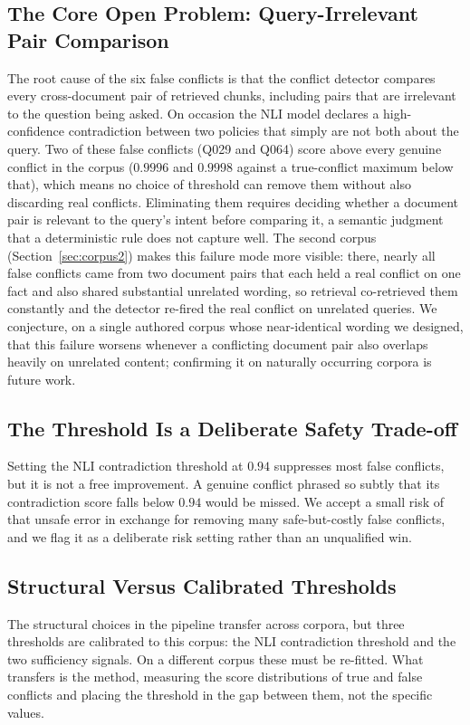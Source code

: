 \documentclass[conference]{IEEEtran}
\begin{document}
\subsection{The Core Open Problem: Query-Irrelevant Pair Comparison}
The root cause of the six false conflicts is that the conflict detector
compares every cross-document pair of retrieved chunks, including pairs that
are irrelevant to the question being asked. On occasion the NLI model
declares a high-confidence contradiction between two policies that simply
are not both about the query. Two of these false conflicts (Q029 and Q064)
score above every genuine conflict in the corpus ($0.9996$ and $0.9998$
against a true-conflict maximum below that), which means no choice of
threshold can remove them without also discarding real conflicts.
Eliminating them requires deciding whether a document pair is relevant to
the query's intent before comparing it, a semantic judgment that a
deterministic rule does not capture well. The second corpus
(Section~\ref{sec:corpus2}) makes this failure mode more visible: there,
nearly all false conflicts came from two document pairs that each held a real
conflict on one fact and also shared substantial unrelated wording, so
retrieval co-retrieved them constantly and the detector re-fired the real
conflict on unrelated queries. We conjecture, on a single authored corpus
whose near-identical wording we designed, that this failure worsens whenever a
conflicting document pair also overlaps heavily on unrelated content;
confirming it on naturally occurring corpora is future work.

\subsection{The Threshold Is a Deliberate Safety Trade-off}
Setting the NLI contradiction threshold at $0.94$ suppresses most false
conflicts, but it is not a free improvement. A genuine conflict phrased so
subtly that its contradiction score falls below $0.94$ would be missed. We
accept a small risk of that unsafe error in exchange for removing many
safe-but-costly false conflicts, and we flag it as a deliberate risk setting
rather than an unqualified win.

\subsection{Structural Versus Calibrated Thresholds}
The structural choices in the pipeline transfer across corpora, but three
thresholds are calibrated to this corpus: the NLI contradiction threshold
and the two sufficiency signals. On a different corpus these must be
re-fitted. What transfers is the method, measuring the score distributions
of true and false conflicts and placing the threshold in the gap between
them, not the specific values.
\end{document}
